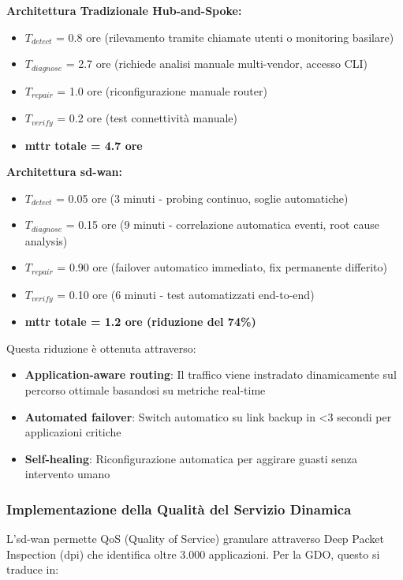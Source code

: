 \textbf{Architettura Tradizionale Hub-and-Spoke:}
\begin{itemize}
    \item $T_{detect}$ = 0.8 ore (rilevamento tramite chiamate utenti o monitoring basilare)
    \item $T_{diagnose}$ = 2.7 ore (richiede analisi manuale multi-vendor, accesso CLI)
    \item $T_{repair}$ = 1.0 ore (riconfigurazione manuale router)
    \item $T_{verify}$ = 0.2 ore (test connettività manuale)
    \item \textbf{\gls{mttr} totale = 4.7 ore}
\end{itemize}

\textbf{Architettura \gls{sd-wan}:}
\begin{itemize}
    \item $T_{detect}$ = 0.05 ore (3 minuti - probing continuo, soglie automatiche)
    \item $T_{diagnose}$ = 0.15 ore (9 minuti - correlazione automatica eventi, root cause analysis)
    \item $T_{repair}$ = 0.90 ore (failover automatico immediato, fix permanente differito)
    \item $T_{verify}$ = 0.10 ore (6 minuti - test automatizzati end-to-end)
    \item \textbf{\gls{mttr} totale = 1.2 ore (riduzione del 74\%)}
\end{itemize}

Questa riduzione è ottenuta attraverso:
\begin{itemize}
    \item \textbf{Application-aware routing}: Il traffico viene instradato dinamicamente sul percorso ottimale basandosi su metriche real-time
    \item \textbf{Automated failover}: Switch automatico su link backup in <3 secondi per applicazioni critiche
    \item \textbf{Self-healing}: Riconfigurazione automatica per aggirare guasti senza intervento umano
\end{itemize}

\subsubsection{\texorpdfstring{Implementazione della Qualità del Servizio Dinamica}{3.3.1.3 - Implementazione della Qualità del Servizio Dinamica}}

L'\gls{sd-wan} permette QoS (Quality of Service) granulare attraverso Deep Packet Inspection (\gls{dpi}) che identifica oltre 3.000 applicazioni. Per la GDO, questo si traduce in:

